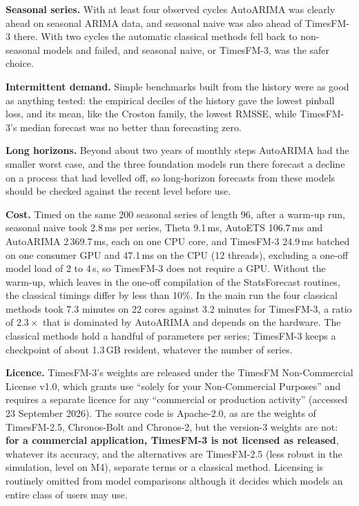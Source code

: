 \documentclass[ASNA]{USG}
\newcommand{\pkg}[1]{\textsf{#1}}
\begin{document}
\textbf{Seasonal series.} With at least four observed cycles AutoARIMA was clearly ahead on seasonal ARIMA
data, and seasonal naive was also ahead of TimesFM-3 there. With two cycles the automatic classical methods
fell back to non-seasonal models and failed, and seasonal naive, or TimesFM-3, was the safer choice.

\textbf{Intermittent demand.} Simple benchmarks built from the history were as good as anything tested: the
empirical deciles of the history gave the lowest pinball loss, and its mean, like the Croston family, the
lowest RMSSE, while TimesFM-3's median forecast was no better than forecasting zero.

\textbf{Long horizons.} Beyond about two years of monthly steps AutoARIMA had the smaller worst case, and the three foundation models run there forecast a decline on a process that had levelled off, so long-horizon forecasts from
these models should be checked against the recent level before use.

\textbf{Cost.} Timed on the same 200 seasonal series of length 96, after a warm-up run, seasonal naive
took 2.8\,ms per series, Theta 9.1\,ms, AutoETS 106.7\,ms and AutoARIMA 2\,369.7\,ms, each on one CPU core,
and TimesFM-3 24.9\,ms batched on one consumer GPU and 47.1\,ms on the CPU (12 threads), excluding a
one-off model load of 2 to 4\,s, so TimesFM-3 does not require a GPU. Without the warm-up, which leaves in
the one-off compilation of the \pkg{StatsForecast} routines, the classical timings differ by less than
10\%. In the main run the four
classical methods took 7.3 minutes on 22 cores against 3.2 minutes for TimesFM-3, a ratio of $2.3\times$ that
is dominated by AutoARIMA and depends on the hardware. The classical methods hold a handful of parameters per
series; TimesFM-3 keeps a checkpoint of about 1.3\,GB resident, whatever the number of series.

\textbf{Licence.} TimesFM-3's weights are released under the TimesFM Non-Commercial License v1.0, which
grants use ``solely for your Non-Commercial Purposes'' and requires a separate licence for any ``commercial
or production activity'' \citep{timesfm3repo, timesfm3card} (accessed 23 September 2026). The source code is
Apache-2.0, as are the weights of TimesFM-2.5, Chronos-Bolt and Chronos-2, but the version-3 weights are not:
\textbf{for a commercial application, TimesFM-3 is not licensed as released}, whatever its accuracy, and the
alternatives are TimesFM-2.5 (less robust in the simulation, level on M4), separate terms or a classical
method. Licensing is routinely omitted from model comparisons although it decides which models an entire
class of users may use.
\end{document}
